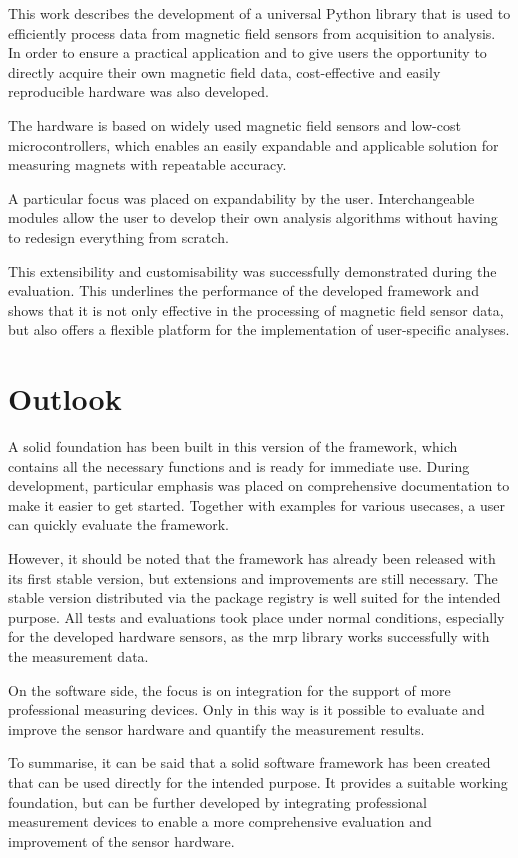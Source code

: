 This work describes the development of a universal Python library that
is used to efficiently process data from magnetic field sensors from
acquisition to analysis. In order to ensure a practical application and
to give users the opportunity to directly acquire their own magnetic
field data, cost-effective and easily reproducible hardware was also
developed.

The hardware is based on widely used magnetic field sensors and low-cost
microcontrollers, which enables an easily expandable and applicable
solution for measuring magnets with repeatable accuracy.

A particular focus was placed on expandability by the user.
Interchangeable modules allow the user to develop their own analysis
algorithms without having to redesign everything from scratch.

This extensibility and customisability was successfully demonstrated
during the evaluation. This underlines the performance of the developed
framework and shows that it is not only effective in the processing of
magnetic field sensor data, but also offers a flexible platform for the
implementation of user-specific analyses.

\hypertarget{outlook}{%
\section{Outlook}\label{outlook}}

A solid foundation has been built in this version of the framework,
which contains all the necessary functions and is ready for immediate
use. During development, particular emphasis was placed on comprehensive
documentation to make it easier to get started. Together with examples
for various usecases, a user can quickly evaluate the framework.

However, it should be noted that the framework has already been released
with its first stable version, but extensions and improvements are still
necessary. The stable version distributed via the package registry is
well suited for the intended purpose. All tests and evaluations took
place under normal conditions, especially for the developed hardware
sensors, as the \gls{mrp} library works successfully with the
measurement data.

On the software side, the focus is on integration for the support of
more professional measuring devices. Only in this way is it possible to
evaluate and improve the sensor hardware and quantify the measurement
results.

To summarise, it can be said that a solid software framework has been
created that can be used directly for the intended purpose. It provides
a suitable working foundation, but can be further developed by
integrating professional measurement devices to enable a more
comprehensive evaluation and improvement of the sensor hardware.

